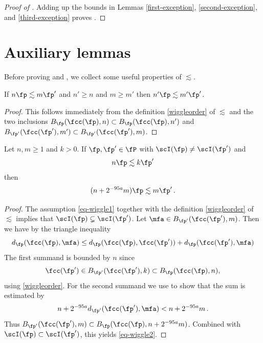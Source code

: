 \begin{proof}[Proof of ]
    \leanok
Adding up the bounds in Lemmas \ref{first-exception}, \ref{second-exception}, and \ref{third-exception} proves .
\end{proof}


\section{Auxiliary lemmas}
\label{subsec-lessim-aux}
Before proving  and , we collect some useful properties of $\lesssim$.

\begin{lemma}
    \label{wiggle-order-1}
    \leanok
    If $n\fp \lesssim m\fp'$ and
    $n' \ge n$ and $m \ge m'$ then $n'\fp \lesssim m'\fp'$.
\end{lemma}

\begin{proof}
    \leanok
    This follows immediately from the definition \eqref{wiggleorder} of $\lesssim$ and the two inclusions $B_{\fp}(\fcc(\fp), n) \subset B_{\fp}(\fcc(\fp), n')$ and $B_{\fp'}(\fcc(\fp'), m') \subset B_{\fp'}(\fcc(\fp'), m)$.
\end{proof}

\begin{lemma}
    \label{wiggle-order-2}
    \leanok

    Let $n, m \ge 1$ and $k > 0$.
    If $\fp, \fp' \in \fP$ with $\scI(\fp) \ne \scI(\fp')$ and
    \begin{equation}
        \label{eq-wiggle1}
        n \fp \lesssim k \fp'
    \end{equation}
    then
    \begin{equation}
        \label{eq-wiggle2}
        (n + 2^{-95 a} m) \fp \lesssim m\fp'\,.
    \end{equation}
\end{lemma}

\begin{proof}
    \leanok
    The assumption \eqref{eq-wiggle1} together with the definition \eqref{wiggleorder} of $\lesssim$ implies that $\scI(\fp) \subsetneq \scI(\fp')$. Let $\mfa \in B_{\fp'}(\fcc(\fp'), m)$. Then we have by the triangle inequality
    $$
        d_{\fp}(\fcc(\fp), \mfa) \le d_{\fp}(\fcc(\fp), \fcc(\fp')) + d_{\fp}(\fcc(\fp'), \mfa)
    $$
    The first summand is bounded by $n$ since
    $$
        \fcc(\fp') \in B_{\fp'}(\fcc(\fp'), k) \subset B_{\fp}(\fcc(\fp), n),
    $$
    using \eqref{wiggleorder}. For the second summand we use 
    to show that the sum is estimated by
    $$
        n + 2^{-95a} d_{\fp'}(\fcc(\fp'), \mfa) < n + 2^{-95a} m\,.
    $$
    Thus $B_{\fp'}(\fcc(\fp'),m) \subset B_{\fp}(\fcc(\fp),n + 2^{-95a}m)$. Combined with $\scI(\fp) \subset \scI(\fp')$, this yields \eqref{eq-wiggle2}.
\end{proof}

